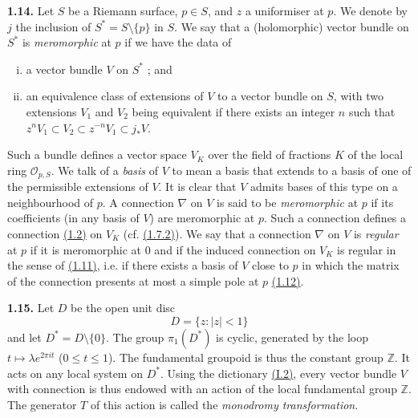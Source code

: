 \documentclass{report}
\newenvironment{rmenv}[1]
  {\phantomsection\par\medskip\noindent\textbf{#1.}\rmfamily}
  {\medskip}
\renewcommand{\cal}[1]{{\mathcal{#1}}}
\newcommand{\ZZ}{\mathbb{Z}}
\renewcommand{\leq}{\leqslant}
\newcommand{\oldpage}[1]{\marginpar{\footnotesize$\Big\vert$ \textit{p.~#1}}}
\begin{document}
\begin{rmenv}{1.14}
\label{II.1.14}
  Let $S$ be a Riemann surface, $p\in S$, and $z$ a uniformiser at $p$.
  We denote by $j$ the inclusion of $S^*=S\setminus\{p\}$ in $S$.
  We say that a (holomorphic) vector bundle on $S^*$ is \emph{meromorphic} at $p$ if we have the data of
  \begin{enumerate}[(i)]
    \item a vector bundle $V$ on $S^*$ ; and
    \item an equivalence class of extensions of $V$ to a vector bundle on $S$, with two extensions $V_1$ and $V_2$ being equivalent if there exists an integer $n$ such that $z^nV_1\subset V_2\subset z^{-n}V_1\subset j_*V$.
  \end{enumerate}

  Such a bundle defines a vector space $V_K$ over the field of fractions $K$ of the local ring $\cal{O}_{p,S}$.
  We talk of a \emph{basis} of $V$ to mean a basis that extends to a basis of one of the permissible extensions of $V$.
  It is clear that $V$ admits bases of this type on a neighbourhood of $p$.
  A connection $\nabla$ on $V$ is said to be \emph{meromorphic} at $p$ if its coefficients (in any basis of $V$) are meromorphic at $p$.
  Such a connection defines a connection \hyperref[II.1.2]{(1.2)} on $V_K$ (cf. \hyperref[II.1.7.2]{(1.7.2)}).
  We say that a connection $\nabla$ on $V$ is \emph{regular} at $p$ if it is meromorphic at $0$ and if the induced connection on $V_K$ is regular in the sense of \hyperref[II.1.11]{(1.11)}, i.e. if there exists a basis of $V$ close to $p$ in which the matrix of the connection presents at most a simple pole at $p$ \hyperref[II.1.12]{(1.12)}.
\end{rmenv}

\begin{rmenv}{1.15}
\label{II.1.15}
  Let $D$ be the open unit disc
  \[
    D = \{z : |z|<1\}
  \]
  and let $D^*=D\setminus\{0\}$.
  The group $\pi_1(D^*)$ is cyclic, generated by the loop
\oldpage{53}
  $t\mapsto\lambda e^{2\pi it}$ ($0\leq t\leq1$).
  The fundamental groupoid is thus the constant group $\ZZ$.
  It acts on any local system on $D^*$.
  Using the dictionary \hyperref[I.2]{(I.2)}, every vector bundle $V$ with connection is thus endowed with an action of the local fundamental group $\ZZ$.
  The generator $T$ of this action is called the \emph{monodromy transformation}.
\end{rmenv}
\end{document}
